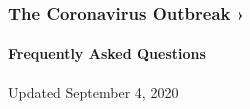 \href{https://www.nytimes3xbfgragh.onion/news-event/coronavirus?action=click\&pgtype=Article\&state=default\&region=MAIN_CONTENT_3\&context=storylines_faq}{}

\hypertarget{the-coronavirus-outbreak-}{%
\subsubsection{The Coronavirus Outbreak
›}\label{the-coronavirus-outbreak-}}

\hypertarget{frequently-asked-questions}{%
\paragraph{Frequently Asked
Questions}\label{frequently-asked-questions}}

Updated September 4, 2020

